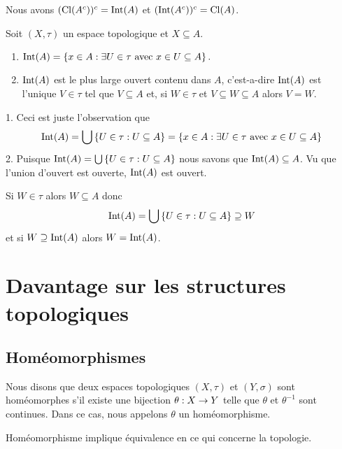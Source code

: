 \documentclass[french]{article}
\begin{document}
\begin{lemme}
  Nous avons $(\mathrm{Cl}(A^{c}))^{c} = \mathrm{Int}(A)$ et $(\mathrm{Int}(A^{c}))^{c} = \mathrm{Cl}(A)$.
\end{lemme}

\begin{lemme}
  Soit $(X, \tau)$ un espace topologique et $X \subseteq A$.
  \begin{enumerate}
    \item $\mathrm{Int}(A) = \left\{ x \in A : \exists U \in \tau \text{ avec } x \in U \subseteq A \right\}.$ 
    \item $\mathrm{Int}(A)$ est le plus large ouvert contenu dans $A$, c'est-a-dire $\mathrm{Int}(A)$ est l'unique $V \in \tau$ tel que $V \subseteq A$ et, si $W \in \tau$ et $V \subseteq W \subseteq A$ alors $V = W$.
  \end{enumerate}

  \tcblower
  \begin{preuve}
    1. Ceci est juste l'observation que
    $$\mathrm{Int}(A) = \bigcup \left\{ U \in \tau : U \subseteq A \right\} =\left\{ x \in A : \exists U \in \tau \text{ avec } x \in U \subseteq A \right\} $$
    2. Puisque $\mathrm{Int}(A) = \bigcup \left\{ U \in \tau : U \subseteq A \right\}$ nous savons que $\mathrm{Int}(A) \subseteq A$. Vu que l'union d'ouvert est ouverte, $\mathrm{Int}(A)$ est ouvert.
    \par Si $W \in \tau$ alors $W \subseteq A$ donc
    $$\mathrm{Int}(A) = \bigcup \left\{ U \in \tau : U \subseteq A \right\} \supseteq W$$
    et si $W \supseteq \mathrm{Int}(A)$ alors $W = \mathrm{Int}(A)$.
  \end{preuve}  
\end{lemme}

\section{Davantage sur les structures topologiques}
\subsection{Homéomorphismes}

\begin{definition}
  Nous disons que deux espaces topologiques $(X, \tau)$ et $(Y, \sigma)$ sont homéomorphes s'il existe une bijection $\theta: X \rightarrow Y$ telle que $\theta$ et $\theta^{-1}$ sont continues. Dans ce cas, nous appelons $\theta$ un homéomorphisme.
\end{definition}
\begin{remarque}
  Homéomorphisme implique équivalence en ce qui concerne la topologie.
\end{remarque}
\end{document}
